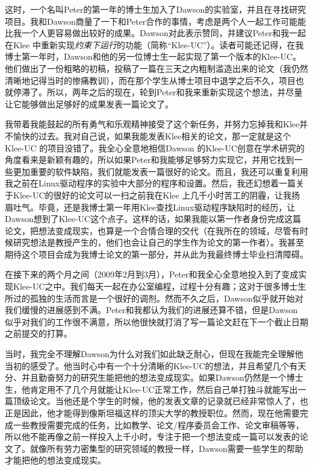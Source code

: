 \documentclass[letter,12pt]{book}
\begin{document}
\begin{CJK}{UTF8}{gbsn}
这时，一个名叫Peter的第一年的博士生加入了Dawson的实验室，并且在寻找研究项目。我和Dawson商量了一下和Peter合作的事情，考虑是两个人一起工作可能能比我一个人更容易做出较好的成果。Dawson对此表示赞同，并建议Peter和我一起在Klee 中重新实现\emph{约束下运行}的功能（简称“Klee-UC”）。读者可能还记得，在我博士第一年时，Dawson和他的另一位博士生一起实现了第一个版本的Klee-UC。他们做出了一份粗略的初稿，投稿了一篇在三天之内粗制滥造出来的论文（我仍然清晰地记得当时的惨痛教训），而在那个学生从博士项目中退学之后不久，项目也就停滞了。所以，两年之后的现在，轮到Peter和我来重新实现这个想法，并尽量让它能够做出足够好的成果发表一篇论文了。

我带着我能鼓起的所有勇气和乐观精神接受了这个新任务，并努力忘掉我和Klee并不愉快的过去。我对自己说，如果我能发表Klee相关的论文，那一定就是这个Klee-UC 的项目没错了。我全心全意地相信Dawson 的Klee-UC创意在学术研究的角度看来是新颖有趣的，所以如果Peter和我能够足够努力实现它，并用它找到一些更加重要的软件缺陷，我们就能发表一篇很好的论文。而且，我还可以重复利用我之前在Linux驱动程序的实验中大部分的程序和设置。然后，我还幻想着一篇关于Klee-UC的很好的论文可以一扫之前我在Klee 上几千小时苦工的阴霾，让我扬眉吐气。毕竟，还是我博士第一年用Klee查找Linux驱动程序缺陷时的经历，让Dawson想到了Klee-UC这个点子。这样的话，如果我能以第一作者身份完成这篇论文，把想法变成现实，也算是一个合情合理的交代（在我所在的领域，尽管有时候研究想法是教授产生的，他们也会让自己的学生作为论文的第一作者）。我甚至期待这个项目会成为我博士论文的第一部分，并从此为我最终博士毕业扫清障碍。

在接下来的两个月之间（2009年2月到3月），Peter和我全心全意地投入到了变成实现Klee-UC之中。我们每天一起在办公室编程，过程十分有趣；这对于很多博士生所过的孤独的生活而言是一个很好的调剂。然而不久之后，Dawson似乎就开始对我们缓慢的进展感到不满。Peter和我都认为我们的进展还算不错，但是Dawson 似乎对我们的工作很不满意，所以他很快就打消了写一篇论文赶在下一个截止日期之前提交的打算。

当时，我完全不理解Dawson为什么对我们如此缺乏耐心，但现在我能完全理解他当初的感受了。他当时心中有一个十分清晰的Klee-UC的想法，并且希望几个有天分、并且勤奋努力的研究生能把他的想法变成现实。如果Dawson仍然是一个博士生，他肯定用不了几个月就能让Klee-UC正常工作，然后自己单打独斗就能写出一篇顶级论文。当他还是个学生的时候，他的发表文章的记录就已经非常惊人了，也正是因此，他才能得到像斯坦福这样的顶尖大学的教授职位。然而，现在他需要完成一些教授需要完成的任务，比如教学、论文/程序委员会工作、论文审稿等等，所以他不能再像之前一样投入上千小时，专注于把一个想法变成一篇可以发表的论文了。就像所有劳力密集型的研究领域的教授一样，Dawson需要一些学生的帮助才能把他的想法变成现实。


\end{CJK}
\end{document}

